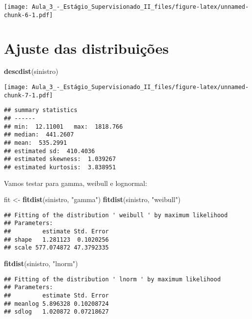 \documentclass[]{article}
\newenvironment{Shaded}{\begin{snugshade}}{\end{snugshade}}
\newcommand{\KeywordTok}[1]{\textcolor[rgb]{0.13,0.29,0.53}{\textbf{#1}}}
\newcommand{\NormalTok}[1]{#1}
\newcommand{\StringTok}[1]{\textcolor[rgb]{0.31,0.60,0.02}{#1}}
\begin{document}
\texttt{[image: Aula\_3\_-\_Estágio\_Supervisionado\_II\_files/figure-latex/unnamed-chunk-6-1.pdf]}

\hypertarget{ajuste-das-distribuicoes}{%
\section{Ajuste das distribuições}\label{ajuste-das-distribuicoes}}

\begin{Shaded}
\begin{Highlighting}[]
\KeywordTok{descdist}\NormalTok{(sinistro)}
\end{Highlighting}
\end{Shaded}

\texttt{[image: Aula\_3\_-\_Estágio\_Supervisionado\_II\_files/figure-latex/unnamed-chunk-7-1.pdf]}

\begin{verbatim}
## summary statistics
## ------
## min:  12.11001   max:  1818.766 
## median:  441.2607 
## mean:  535.2991 
## estimated sd:  410.4036 
## estimated skewness:  1.039267 
## estimated kurtosis:  3.838951
\end{verbatim}

Vamos testar para gamma, weibull e lognormal:

\begin{Shaded}
\begin{Highlighting}[]
\NormalTok{fit <-}\StringTok{ }\KeywordTok{fitdist}\NormalTok{(sinistro, }\StringTok{"gamma"}\NormalTok{)}
\KeywordTok{fitdist}\NormalTok{(sinistro, }\StringTok{"weibull"}\NormalTok{)}
\end{Highlighting}
\end{Shaded}

\begin{verbatim}
## Fitting of the distribution ' weibull ' by maximum likelihood 
## Parameters:
##         estimate Std. Error
## shape   1.281123  0.1020256
## scale 577.074872 47.3792335
\end{verbatim}

\begin{Shaded}
\begin{Highlighting}[]
\KeywordTok{fitdist}\NormalTok{(sinistro, }\StringTok{"lnorm"}\NormalTok{)}
\end{Highlighting}
\end{Shaded}

\begin{verbatim}
## Fitting of the distribution ' lnorm ' by maximum likelihood 
## Parameters:
##         estimate Std. Error
## meanlog 5.896328 0.10208724
## sdlog   1.020872 0.07218627
\end{verbatim}
\end{document}
